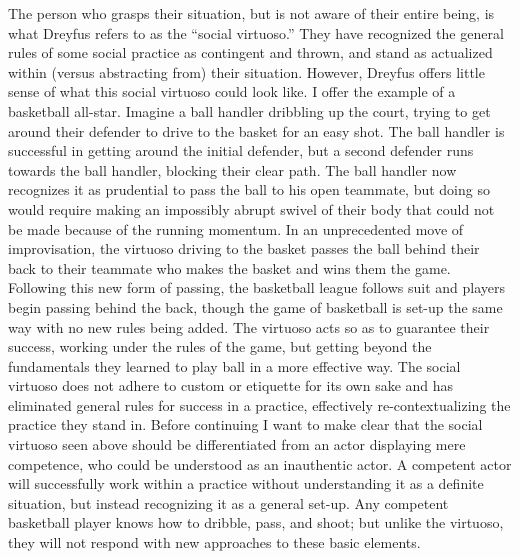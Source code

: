 The person who grasps their situation, but is not aware of their entire
being, is what Dreyfus refers to as the ``social virtuoso.'' They have
recognized the general rules of some social practice as contingent and
thrown, and stand as actualized within (versus abstracting from) their
situation. However, Dreyfus offers little sense of what this social
virtuoso could look like. I offer the example of a basketball all-star.
Imagine a ball handler dribbling up the court, trying to get around
their defender to drive to the basket for an easy shot. The ball handler
is successful in getting around the initial defender, but a second
defender runs towards the ball handler, blocking their clear path. The
ball handler now recognizes it as prudential to pass the ball to his
open teammate, but doing so would require making an impossibly abrupt
swivel of their body that could not be made because of the running
momentum. In an unprecedented move of improvisation, the virtuoso
driving to the basket passes the ball behind their back to their
teammate who makes the basket and wins them the game. Following this new
form of passing, the basketball league follows suit and players begin
passing behind the back, though the game of basketball is set-up the
same way with no new rules being added. The virtuoso acts so as to
guarantee their success, working under the rules of the game, but
getting beyond the fundamentals they learned to play ball in a more
effective way. The social virtuoso does not adhere to custom or
etiquette for its own sake and has eliminated general rules for success
in a practice, effectively re-contextualizing the practice they stand
in. Before continuing I want to make clear that the social virtuoso seen
above should be differentiated from an actor displaying mere competence,
who could be understood as an inauthentic actor. A competent actor will
successfully work within a practice without understanding it as a
definite situation, but instead recognizing it as a general set-up. Any
competent basketball player knows how to dribble, pass, and shoot; but
unlike the virtuoso, they will not respond with new approaches to these
basic elements.

